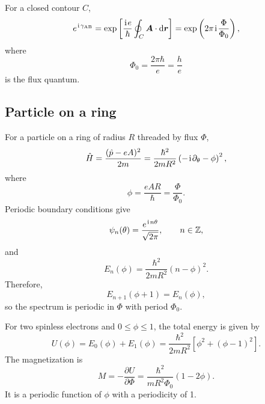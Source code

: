 For a closed contour $C$,
\begin{equation}
 e^{\hspace{1pt}\mathrm{i}\hspace{1pt}\gamma_{\mathrm{AB}}}
 =\exp\left[
 \frac{\hspace{1pt}\mathrm{i}\hspace{1pt} e}{\hbar}\oint_C\bm A\cdot\mathrm{d}\bm r\right]
 =\exp\left(2\pi\hspace{1pt}\mathrm{i}\hspace{1pt}\frac{\Phi}{\Phi_0}\right),
\end{equation}
where
\begin{equation}
 \boxed{\Phi_0=\frac{2\pi\hbar}{e}=\frac{h}{e}}
\end{equation}
is the flux quantum.

\subsection{Particle on a ring}
For a particle on a ring of radius $R$ threaded by flux $\Phi$,
\begin{equation}
 \hat H
 =\frac{(\hat p-eA)^2}{2m}
 =\frac{\hbar^2}{2mR^2}
 \left(-\hspace{1pt}\mathrm{i}\hspace{1pt}\partial_\theta-\phi\right)^2,
\end{equation}
where
\begin{equation}
 \phi=\frac{eAR}{\hbar}
 =\frac{\Phi}{\Phi_0}.
\end{equation}
Periodic boundary conditions give
\begin{equation}
 \psi_n(\theta)=\frac{e^{\hspace{1pt}\mathrm{i}\hspace{1pt} n\theta}}{\sqrt{2\pi}},
 \qquad n\in\mathbb Z,
\end{equation}
and
\begin{equation}
 \boxed{
 E_n(\phi)=\frac{\hbar^2}{2mR^2}(n-\phi)^2.}
\end{equation}
Therefore,
\begin{equation}
 E_{n+1}(\phi+1)=E_n(\phi),
\end{equation}
so the spectrum is periodic in $\Phi$ with period $\Phi_0$.

For two spinless electrons and $0\leq\phi\leq1$, the total energy is given by
\begin{equation}
 U(\phi)=E_0(\phi)+E_1(\phi)
 =\frac{\hbar^2}{2mR^2}
 \left[\phi^2+(\phi-1)^2\right].
\end{equation}
The magnetization is
\begin{equation}
 \boxed{
 M=-\frac{\partial U}{\partial\Phi}
 =\frac{\hbar^2}{mR^2\Phi_0}(1-2\phi).}
\end{equation}
It is a periodic function of $\phi$ with a periodicity of 1. 

